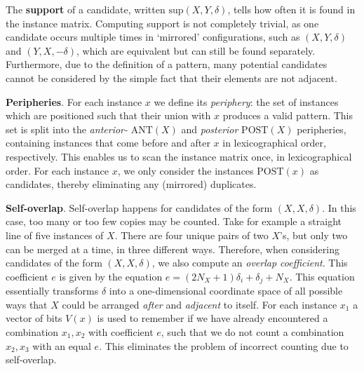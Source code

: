 \documentclass{llncs}
\begin{document}
The \textbf{support} of a candidate, written $\mathrm{sup}(X,Y,\delta)$, tells how often it is found in the instance matrix. Computing support is not completely trivial, as one candidate occurs multiple times in `mirrored' configurations, such as $(X,Y,\delta)$ and $(Y,X,-\delta)$, which are equivalent but can still be found separately. Furthermore, due to the definition of a pattern, many potential candidates cannot be considered by the simple fact that their elements are not adjacent. 

\smallskip \noindent \textbf{Peripheries}. For each instance $x$ we define its \emph{periphery}: the set of instances which are positioned such that their union with $x$ produces a valid pattern. This set is split into the \emph{anterior-} $\mathrm{ANT}(X)$ and \emph{posterior} $\mathrm{POST}(X)$ peripheries, containing instances that come before and after $x$ in lexicographical order, respectively. This enables us to scan the instance matrix once, in lexicographical order. For each instance $x$, we only consider the instances $\mathrm{POST}(x)$ as candidates, thereby eliminating any (mirrored) duplicates. 

\smallskip \noindent \textbf{Self-overlap}. Self-overlap happens for candidates of the form $(X,X,\delta)$. In this case, too many or too few copies may be counted. Take for example a straight line of five instances of $X$. There are four unique pairs of two $X$'s, but only two can be merged at a time, in three different ways. Therefore, when considering candidates of the form $(X,X,\delta)$, we also compute an \emph{overlap coefficient}. This coefficient $e$ is given by the equation $e = (2N_X+1)\delta_i + \delta_j + N_X$. This equation essentially transforms $\delta$ into a one-dimensional coordinate space of all possible ways that $X$ could be arranged \emph{after} and \emph{adjacent} to itself. For each instance $x_1$ a vector of bits $V(x)$ is used to remember if we have already encountered a combination $x_1,x_2$ with coefficient $e$, such that we do not count a combination $x_2,x_3$ with an equal $e$. This eliminates the problem of incorrect counting due to self-overlap.
\end{document}
